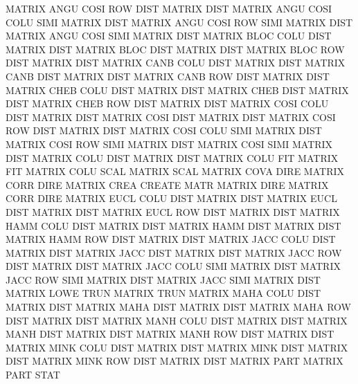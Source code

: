 MATRIX   ANGU COSI ROW  DIST            MATRIX   DIST
MATRIX   ANGU COSI COLU SIMI            MATRIX   DIST
MATRIX   ANGU COSI ROW  SIMI            MATRIX   DIST
MATRIX   ANGU COSI SIMI                 MATRIX   DIST
MATRIX   BLOC COLU DIST                 MATRIX   DIST
MATRIX   BLOC DIST                      MATRIX   DIST
MATRIX   BLOC ROW  DIST                 MATRIX   DIST
MATRIX   CANB COLU DIST                 MATRIX   DIST
MATRIX   CANB DIST                      MATRIX   DIST
MATRIX   CANB ROW  DIST                 MATRIX   DIST
MATRIX   CHEB COLU DIST                 MATRIX   DIST
MATRIX   CHEB DIST                      MATRIX   DIST
MATRIX   CHEB ROW  DIST                 MATRIX   DIST
MATRIX   COSI COLU DIST                 MATRIX   DIST
MATRIX   COSI DIST                      MATRIX   DIST
MATRIX   COSI ROW  DIST                 MATRIX   DIST
MATRIX   COSI COLU SIMI                 MATRIX   DIST
MATRIX   COSI ROW  SIMI                 MATRIX   DIST
MATRIX   COSI SIMI                      MATRIX   DIST
MATRIX   COLU DIST                      MATRIX   DIST
MATRIX   COLU FIT                       MATRIX   FIT
MATRIX   COLU SCAL                      MATRIX   SCAL
MATRIX   COVA DIRE                      MATRIX   CORR DIRE
MATRIX   CREA                           CREATE   MATR
MATRIX   DIRE                           MATRIX   CORR DIRE
MATRIX   EUCL COLU DIST                 MATRIX   DIST
MATRIX   EUCL DIST                      MATRIX   DIST
MATRIX   EUCL ROW  DIST                 MATRIX   DIST
MATRIX   HAMM COLU DIST                 MATRIX   DIST
MATRIX   HAMM DIST                      MATRIX   DIST
MATRIX   HAMM ROW  DIST                 MATRIX   DIST
MATRIX   JACC COLU DIST                 MATRIX   DIST
MATRIX   JACC DIST                      MATRIX   DIST
MATRIX   JACC ROW  DIST                 MATRIX   DIST
MATRIX   JACC COLU SIMI                 MATRIX   DIST
MATRIX   JACC ROW  SIMI                 MATRIX   DIST
MATRIX   JACC SIMI                      MATRIX   DIST
MATRIX   LOWE TRUN                      MATRIX   TRUN
MATRIX   MAHA COLU DIST                 MATRIX   DIST
MATRIX   MAHA DIST                      MATRIX   DIST
MATRIX   MAHA ROW  DIST                 MATRIX   DIST
MATRIX   MANH COLU DIST                 MATRIX   DIST
MATRIX   MANH DIST                      MATRIX   DIST
MATRIX   MANH ROW  DIST                 MATRIX   DIST
MATRIX   MINK COLU DIST                 MATRIX   DIST
MATRIX   MINK DIST                      MATRIX   DIST
MATRIX   MINK ROW  DIST                 MATRIX   DIST
MATRIX   PART                           MATRIX   PART STAT
